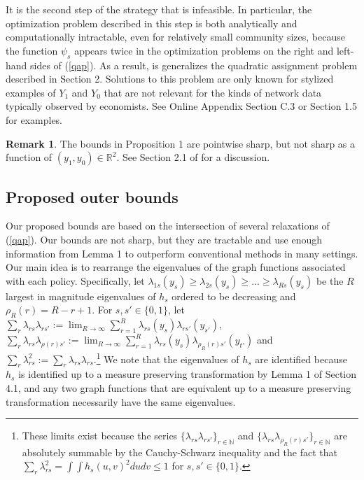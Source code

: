 \documentclass[12pt]{article}
\theoremstyle{definition}
\newtheorem{remark}{Remark}
\begin{document}
It is the second step of the strategy that is infeasible. In particular, the optimization problem described in this step is both analytically and computationally intractable, even for relatively small community sizes, because the function $\psi_{s}$ appears twice in the optimization problems on the right and left-hand sides of (\ref{qap}). As a result, is generalizes the quadratic assignment problem described in Section 2. Solutions to this problem are only known for stylized examples of $Y_{1}$ and $Y_{0}$ that are not relevant for the kinds of network data typically observed by economists. See Online Appendix Section C.3 or \cite{cela2013quadratic} Section 1.5 for examples.  %

\begin{remark}
The bounds in Proposition 1 are pointwise sharp, but not sharp as a function of $(y_1,y_0) \in \mathbb{R}^{2}$. See Section 2.1 of \cite{molinari2020microeconometrics} for a discussion.
\end{remark}

\subsection{Proposed outer bounds}
Our proposed bounds are based on the intersection of several relaxations of (\ref{qap}). Our bounds are not sharp, but they are tractable and use enough information from Lemma 1 to outperform conventional methods in many settings. Our main idea is to rearrange the eigenvalues of the graph functions associated with each policy. Specifically, let $\lambda_{1s}(y_{s}) \geq  \lambda_{2s}(y_{s}) \geq ... \geq \lambda_{Rs}(y_{s})$ be the $R$ largest in magnitude eigenvalues of $h_{s}$ ordered to be decreasing and $\rho_{R}(r) = R - r + 1$. For $s, s' \in \{0,1\}$, let $\sum_{r}\lambda_{rs}\lambda_{rs'} := \lim_{R \to \infty}\sum_{r=1}^{R}\lambda_{rs}(y_{s})\lambda_{rs'}(y_{s'})$, $\sum_{r}\lambda_{rs}\lambda_{\rho(r)s'} :=    \lim_{R \to \infty}\sum_{r=1}^{R}\lambda_{rs}(y_{s})\lambda_{\rho_{R}(r)s'}(y_{t'})$ and $\sum_{r}\lambda_{rs}^{2} := \sum_{r}\lambda_{rs}\lambda_{rs}$.\footnote{These limits exist because the series $\{\lambda_{rs}\lambda_{rs'}\}_{r\in\mathbb{N}}$ and $\{\lambda_{rs}\lambda_{\rho_{R}(r)s'}\}_{r\in\mathbb{N}}$ are absolutely summable by the Cauchy-Schwarz inequality and the fact that $\sum_r \lambda_{rs}^2 = \int\int h_s(u,v)^2dudv \leq 1$ for $s,s' \in \{0,1\}$.}  We note that the eigenvalues of $h_s$ are identified because $h_s$ is identified up to a measure preserving transformation by Lemma 1 of Section 4.1, and any two graph functions that are equivalent up to a measure preserving transformation necessarily have the same eigenvalues.    
\end{document}
